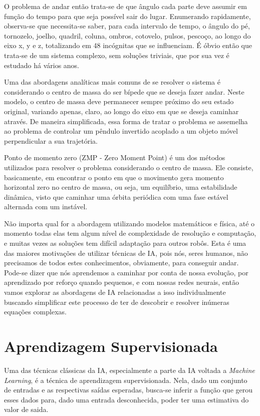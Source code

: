 \documentclass[twoside,conference,a4paper]{IEEEtran}
\begin{document}
O problema de andar então trata-se de que ângulo cada parte deve assumir em função do tempo para que seja possível sair do lugar. Enumerando rapidamente, observa-se que necessita-se saber, para cada intervalo de tempo, o ângulo do pé, tornozelo, joelho, quadril, coluna, ombros, cotovelo, pulsos, pescoço, ao longo do eixo x, y e z, totalizando em 48 incógnitas que se influenciam. É óbvio então que trata-se de um sistema complexo, sem soluções triviais, que por sua vez é estudado há vários anos.

Uma das abordagens analíticas mais comuns de se resolver o sistema é considerando o centro de massa do ser bípede que se deseja fazer andar. Neste modelo, o centro de massa deve permanecer sempre próximo do seu estado original, variando apenas, claro, ao longo do eixo em que se deseja caminhar através. De maneira simplificada, essa forma de tratar o problema se assemelha ao problema de controlar um pêndulo invertido acoplado a um objeto móvel perpendicular a sua trajetória.

Ponto de momento zero (ZMP - Zero Moment Point) é um dos métodos utilizados para resolver o problema considerando o centro de massa. Ele consiste, basicamente, em encontrar o ponto em que o movimento gera momento horizontal zero no centro de massa, ou seja, um equilíbrio, uma estabilidade dinâmica, visto que caminhar uma órbita periódica com uma fase estável alternada com um instável.

Não importa qual for a abordagem utilizando modelos matemáticos e física, até o momento todas elas tem algum nível de complexidade de resolução e computação, e muitas vezes as soluções tem difícil adaptação para outros robôs. Esta é uma das maiores motivações de utilizar técnicas de IA, pois nós, seres humanos, não precisamos de todos estes conhecimentos, obviamente, para conseguir andar. Pode-se dizer que nós aprendemos a caminhar por conta de nossa evolução, por aprendizado por reforço quando pequenos, e com nossas redes neurais, então vamos explorar as abordagens de IA relacionadas a isso individualmente buscando simplificar este processo de ter de descobrir e resolver inúmeras equações complexas.

\section{Aprendizagem Supervisionada} \label{aprendizagem_supervisionada}

Uma das técnicas clássicas da IA, especialmente a parte da IA voltada a \textsl{Machine Learning}, é a técnica de aprendizagem supervisionada. Nela, dado um conjunto de entradas e as respectivas saídas esperadas, busca-se inferir a função que gerou esses dados para, dado uma entrada desconhecida, poder ter uma estimativa do valor de saida.
\end{document}
